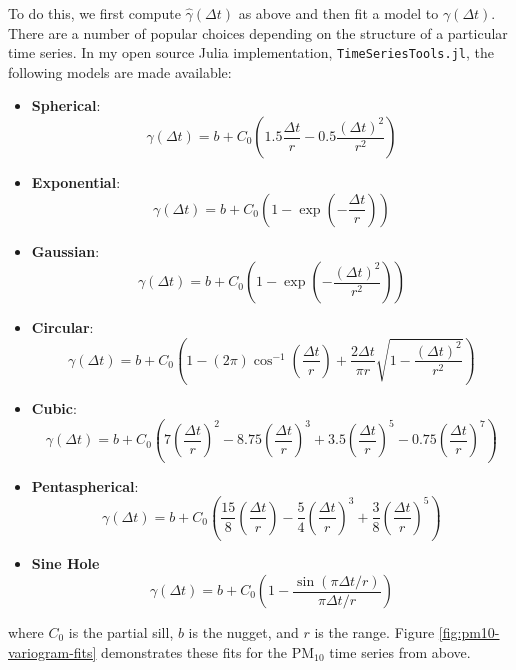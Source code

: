 To do this, we first compute $\hat{\gamma}(\Delta t)$ as above and then fit a model to $\gamma(\Delta t)$. There are a number of popular choices depending on the structure of a particular time series. In my open source Julia implementation, \texttt{TimeSeriesTools.jl}, the following models are made available:
\begin{itemize}
\item \textbf{Spherical}:
  \begin{equation}
    \gamma(\Delta t) = b + C_0\left(1.5\frac{\Delta t}{r} - 0.5 \frac{(\Delta t)^2}{r^2} \right)
  \end{equation}
\item \textbf{Exponential}:
  \begin{equation}
    \gamma(\Delta t) = b + C_0\left( 1 - \exp\left(-\frac{\Delta t}{r}\right)\right)
  \end{equation}
\item \textbf{Gaussian}:
  \begin{equation}
    \gamma(\Delta t) = b + C_0\left( 1 - \exp\left(-\frac{(\Delta t)^2}{r^2}\right)\right)
  \end{equation}
\item \textbf{Circular}:
  \begin{equation}
    \gamma(\Delta t) = b + C_0\left(1 - (2\pi)\cos^{-1}\left(\frac{\Delta t}{r}\right) + \frac{2\Delta t}{\pi r}\sqrt{1-\frac{(\Delta t)^2}{r^2}} \right)
  \end{equation}
\item \textbf{Cubic}:
  \begin{equation}
    \gamma(\Delta t) = b + C_0\left(7\left(\frac{\Delta t}{r} \right)^2 - 8.75 \left(\frac{\Delta t}{r} \right)^3 + 3.5\left(\frac{\Delta t}{r} \right)^5 - 0.75\left(\frac{\Delta t}{r} \right)^7 \right)
  \end{equation}
\item \textbf{Pentaspherical}:
  \begin{equation}
    \gamma(\Delta t) = b + C_0 \left( \frac{15}{8}\left(\frac{\Delta t}{r} \right) - \frac{5}{4}\left(\frac{\Delta t}{r} \right)^3 + \frac{3}{8}\left(\frac{\Delta t}{r}\right)^5 \right)
  \end{equation}
\item \textbf{Sine Hole}
  \begin{equation}
    \gamma(\Delta t) = b + C_0\left(1 - \frac{\sin(\pi\Delta t/r)}{\pi\Delta t/r}\right)
  \end{equation}
\end{itemize}
where $C_0$ is the partial sill, $b$ is the nugget, and $r$ is the range. Figure \ref{fig:pm10-variogram-fits} demonstrates these fits for the $\text{PM}_{10}$ time series from above.

